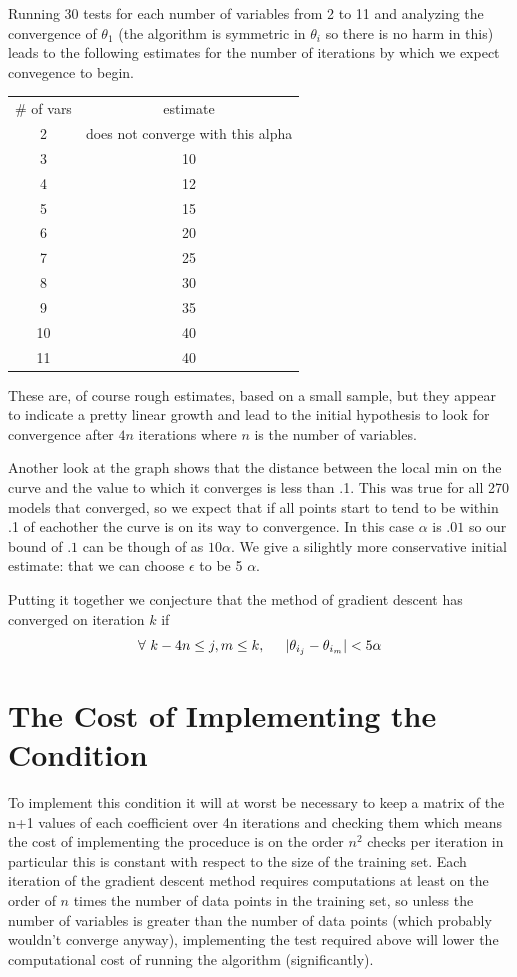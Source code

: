 \documentclass[11pt]{article} %
\begin{document}
Running 30 tests for each number of variables from 2 to 11 and analyzing the convergence of $\theta_{1}$ (the algorithm is symmetric in $\theta_{i}$ so there is no harm in this) leads to the following estimates for the number of iterations by which we expect convegence to begin. 

\begin{tabular} {cc}
\# of vars & estimate \\
2 & does not converge with this alpha\\
3 &  10 \\
4 &  12 \\
5 &  15 \\
6 &  20 \\
7 &  25 \\
8 & 30 \\
9 & 35 \\
10 & 40\\
11 & 40

\end{tabular} 

These are, of course rough estimates, based on a small sample, but they appear to indicate a pretty linear growth and lead to the initial hypothesis to look for convergence after $4n$ iterations where $n$ is the number of variables. 

Another look at the graph shows that the distance between the local min on the curve and the value to which it converges is less than .1.  This was true for all 270 models that converged,
so we expect that if all points start to tend to be within .1 of eachother the curve is on its way to convergence.  In this case $\alpha$ is $.01$ so our bound of $.1$ can be though of as 
$10\alpha$.  We give a silightly more conservative initial estimate: that we can choose $\epsilon$ to be 5 $\alpha$. 

Putting it together we conjecture that the method of gradient descent has converged on iteration $k$ if 
$$\forall\ k - 4n \leq  j,m \leq k, \hspace{.2in} 
|\theta_{i_{j}} - \theta_{i_{m}}| < 5\alpha$$  

\section{The Cost of Implementing the Condition}
To implement this condition it will at worst be necessary to keep a matrix of the n+1 values of each coefficient over 4n iterations and checking them which means the cost of 
implementing the proceduce is on the order $n^2$ checks per iteration in particular this is constant with respect to the size of the training set. Each iteration of the gradient descent method requires computations at least on the order of $n$ times the number of data points in the training set, so unless the number of variables is greater than the number of data points (which probably wouldn't converge anyway), implementing the test required above will lower the computational cost of running the algorithm (significantly). 
\end{document}
